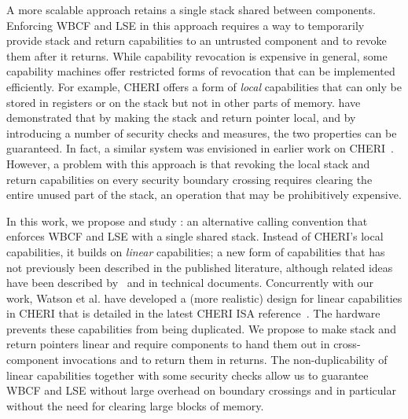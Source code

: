 \documentclass[acmsmall,screen]{acmart}\settopmatter{}
\begin{document}
A more scalable approach retains a single stack shared between components.
Enforcing WBCF and LSE in this approach requires a way to temporarily provide stack and return capabilities to an untrusted component and to revoke them after it returns.
While capability revocation is expensive in general, some capability machines offer restricted forms of revocation that can be implemented efficiently.
For example, CHERI offers a form of {\itshape local} capabilities that can only be stored in registers or on the stack but not in other parts of memory.
\citet{skorstengaard_reasoning_2017} have demonstrated that by making the stack and return pointer local, and by introducing a number of security checks and measures, the two properties can be guaranteed.
In fact, a similar system was envisioned in earlier work on CHERI~\citep{watson2012cheri}. 
However, a problem with this approach is that revoking the local stack and return capabilities on every security boundary crossing requires clearing the entire unused part of the stack, an operation that may be prohibitively expensive.

In this work, we propose and study \stktokens{}: an alternative calling convention that enforces WBCF and LSE with a single shared stack.
Instead of CHERI's local capabilities, it builds on {\itshape linear} capabilities; a new form of capabilities that has not previously been described in the published literature, although related ideas have been described by~\citet[``scarce objects'']{szabo_formalizing_1997,szabo_scarce_objects} and in technical documents.
Concurrently with our work, Watson et al. have developed a (more realistic) design for linear capabilities in CHERI that is detailed in the latest CHERI ISA reference~\citep{watson2018ISA}.
The hardware prevents these capabilities from being duplicated.
We propose to make stack and return pointers linear and require components to hand them out in cross-component invocations and to return them in returns.
The non-duplicability of linear capabilities together with some security checks allow us to guarantee WBCF and LSE without large overhead on boundary crossings and in particular without the need for clearing large blocks of memory.
\end{document}
